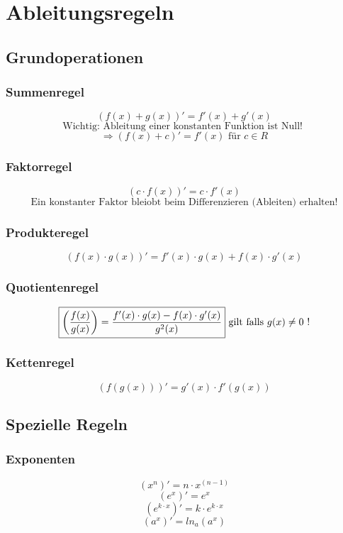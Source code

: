 \section{Ableitungsregeln}

\subsection{Grundoperationen}

\subsubsection{Summenregel}
\[ \boxed{ (f(x) + g(x))' = f'(x) + g'(x) } \]
\[ \text{Wichtig: Ableitung einer konstanten Funktion ist Null! } \]
\[ \Rightarrow (f(x) + c)' = f'(x) \text{ für } c \in R \]

\subsubsection{Faktorregel}
\[ \boxed{ (c \cdot f(x))' = c \cdot f'(x) } \]
\[ \text{Ein konstanter Faktor bleiobt beim Differenzieren (Ableiten) erhalten!} \]

\subsubsection{Produkteregel}
\[ \boxed{ (f(x) \cdot g(x))' = f'(x) \cdot g(x) + f(x) \cdot g'(x) } \]

\subsubsection{Quotientenregel}
\[ \boxed{ \left( \frac{f(x)}{g(x)} \right) = \frac{ f'(x) \cdot g(x) - f(x) \cdot g'(x) }{ g^2(x) } } \\ \text{ gilt falls }g(x) \neq 0 \text{ !} \]

\subsubsection{Kettenregel}
\[ \boxed{ (f(g(x)))' = g'(x) \cdot f'(g(x)) } \]

\newpage

\subsection{Spezielle Regeln}

\subsubsection{Exponenten}
\[ \boxed{ (x^n)' = n\cdot x^{(n-1)} } \]
\[ \boxed{ (e^x)' = e^x } \]
\[ \boxed{ (e^{k\cdot x})' = k \cdot e^{k\cdot x} } \]
\[ \boxed{ (a^x)' = ln_a (a^x) } \]

